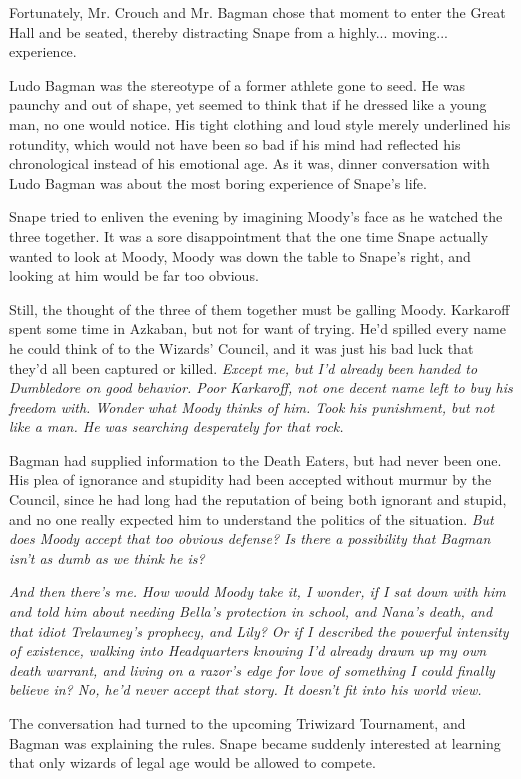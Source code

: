 Fortunately, Mr. Crouch and Mr. Bagman chose that moment to enter the Great Hall and be seated, thereby distracting Snape from a highly... moving... experience.

Ludo Bagman was the stereotype of a former athlete gone to seed. He was paunchy and out of shape, yet seemed to think that if he dressed like a young man, no one would notice. His tight clothing and loud style merely underlined his rotundity, which would not have been so bad if his mind had reflected his chronological instead of his emotional age. As it was, dinner conversation with Ludo Bagman was about the most boring experience of Snape's life.

Snape tried to enliven the evening by imagining Moody's face as he watched the three together. It was a sore disappointment that the one time Snape actually wanted to look at Moody, Moody was down the table to Snape's right, and looking at him would be far too obvious.

Still, the thought of the three of them together must be galling Moody. Karkaroff spent some time in Azkaban, but not for want of trying. He'd spilled every name he could think of to the Wizards' Council, and it was just his bad luck that they'd all been captured or killed. \emph{Except me, but I'd already been handed to Dumbledore on good behavior. Poor Karkaroff, not one decent name left to buy his freedom with. Wonder what Moody thinks of him. Took his punishment, but not like a man. He was searching desperately for that rock.}

Bagman had supplied information to the Death Eaters, but had never been one. His plea of ignorance and stupidity had been accepted without murmur by the Council, since he had long had the reputation of being both ignorant and stupid, and no one really expected him to understand the politics of the situation. \emph{But does Moody accept that too obvious defense? Is there a possibility that Bagman isn't as dumb as we think he is?}

\emph{And then there's me. How would Moody take it, I wonder, if I sat down with him and told him about needing Bella's protection in school, and Nana's death, and that idiot Trelawney's prophecy, and Lily? Or if I described the powerful intensity of existence, walking into Headquarters knowing I'd already drawn up my own death warrant, and living on a razor's edge for love of something I could finally believe in? No, he'd never accept that story. It doesn't fit into his world view.}

The conversation had turned to the upcoming Triwizard Tournament, and Bagman was explaining the rules. Snape became suddenly interested at learning that only wizards of legal age would be allowed to compete.

